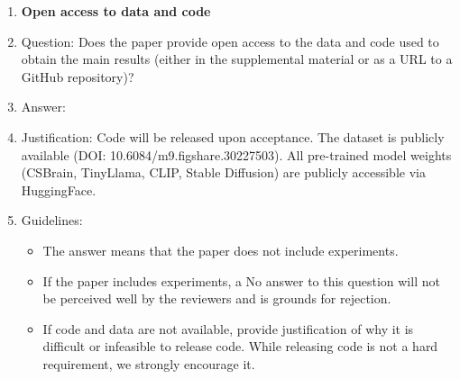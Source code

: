 \documentclass{article}
\begin{document}
\begin{enumerate}
\begin{itemize}
\begin{enumerate}
            \item If the contribution is primarily a new model architecture, the paper should describe the architecture clearly and fully.
            \item If the contribution is a new model and empirical evaluation, the paper should make it possible to reproduce the results (see above) and report what evaluation was performed.
            \item If the contribution is primarily a dataset, the paper should describe the dataset creation process in sufficient detail that it is possible to replicate the dataset creation procedure, or if the dataset is not public, provide a statement why. (We recognize that reproducibility may be difficult in some cases, especially for proprietary datasets or for large-scale datasets that are expensive to recreate, so we err on the side of requiring full descriptions of the dataset that is possible to understand what data was collected and how.)
        \end{enumerate}
    \end{itemize}

\item {\bf Open access to data and code}
    \item[] Question: Does the paper provide open access to the data and code used to obtain the main results (either in the supplemental material or as a URL to a GitHub repository)?
    \item[] Answer: \answerNo{}
    \item[] Justification: Code will be released upon acceptance. The dataset is publicly available (DOI: 10.6084/m9.figshare.30227503). All pre-trained model weights (CSBrain, TinyLlama, CLIP, Stable Diffusion) are publicly accessible via HuggingFace.
    \item[] Guidelines:
    \begin{itemize}
        \item The answer \answerNA{} means that the paper does not include experiments.
        \item If the paper includes experiments, a No answer to this question will not be perceived well by the reviewers and is grounds for rejection.
        \item If code and data are not available, provide justification of why it is difficult or infeasible to release code. While releasing code is not a hard requirement, we strongly encourage it.
    \end{itemize}


\end{enumerate}
\end{document}
